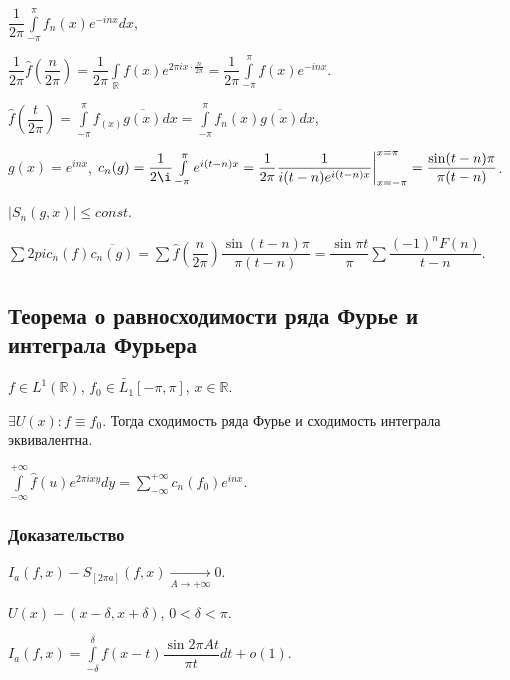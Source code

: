 \documentclass{article}
\begin{document}
            $\dfrac{1}{2 \pi} \int\limits^{\pi}_{-\pi} f_n(x) e^{-inx} dx$,
            
            $\dfrac{1}{2 \pi} \hat{f} \left( \dfrac{n}{2 \pi} \right) = \dfrac{1}{2 \pi} \int\limits_{\mathbb{R}} f(x) e^{2 \pi i x \cdot \frac{n}{2 \pi}} = \dfrac{1}{2 \pi} \int\limits^{\pi}_{-\pi} f(x) e^{-inx}$.
            
            $\hat{f} \left( \dfrac{t}{2 \pi} \right) = \int\limits^{\pi}_{-\pi} f_(x) \overline{g(x)} dx = \int\limits^{\pi}_{-\pi} f_n(x) \overline{g(x)} dx$,
            
            $g(x) = e^{inx}$, $c_n(g) = \dfrac{1}{2 \i} \int\limits^{\pi}_{-\pi} e^{i (t - n) x} = \dfrac{1}{2 \pi} \dfrac{1}{i (t - n) e^{i (t - n) x}} \bigg|^{x = \pi}_{x = -\pi} = \dfrac{\sin (t - n) \pi}{\pi (t - n)}$.
            
            $\left| S_n(g, x) \right| \leqslant const$.
            
            $\sum 2pi c_n(f) \overline{c_n(g)} = \sum \hat{f} \left( \dfrac{n}{2 \pi} \right) \dfrac{\sin (t - n) \pi}{\pi (t - n)} = \dfrac{\sin \pi t}{\pi} \sum \dfrac{(-1)^n F(n)}{t - n}$.
            
    \subsection{Теорема о равносходимости ряда Фурье и интеграла Фурьера}
    
        $f \in L^1 (\mathbb{R})$, $f_0 \in \widetilde{L_1} [-\pi, \pi]$, $x \in \mathbb{R}$.
        
        $\exists U(x) : f \equiv f_0$. Тогда сходимость ряда Фурье и сходимость интеграла эквивалентна.
        
        $\int\limits^{+\infty}_{-\infty} \hat{f}(u) e^{2 \pi i x y} dy = \sum\limits^{+\infty}_{-\infty} c_n(f_0) e^{inx}$.
        
        \subsubsection{Доказательство}
        
            $I_a(f, x) - S_{[2\pi a]} (f, x) \xrightarrow[A \rightarrow +\infty]{} 0$.
            
            $U(x) - (x - \delta, x + \delta)$, $0 < \delta < \pi$.
            
            $I_a(f, x) = \int\limits^{\delta}_{-\delta} f(x - t) \dfrac{\sin 2 \pi A t}{\pi t} dt + o(1)$.
            
\end{document}
